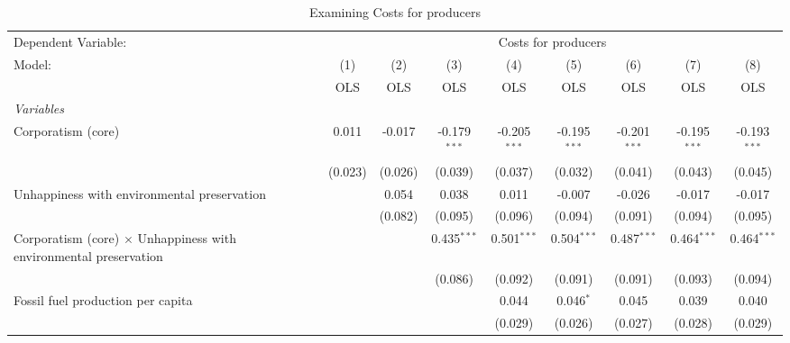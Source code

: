 
\begin{table}[htbp]
   \caption{Examining Costs for producers}
   \centering
   \begin{tabular}{lcccccccc}
      \toprule
      Dependent Variable: & \multicolumn{8}{c}{Costs for producers}\\
      Model:                                                                   & (1)     & (2)     & (3)            & (4)            & (5)            & (6)            & (7)            & (8)\\  
                                                                               &  OLS    & OLS     & OLS            & OLS            & OLS            & OLS            & OLS            & OLS\\  
      \midrule
      \emph{Variables}\\
      Corporatism (core)                                                       & 0.011   & -0.017  & -0.179$^{***}$ & -0.205$^{***}$ & -0.195$^{***}$ & -0.201$^{***}$ & -0.195$^{***}$ & -0.193$^{***}$\\   
                                                                               & (0.023) & (0.026) & (0.039)        & (0.037)        & (0.032)        & (0.041)        & (0.043)        & (0.045)\\   
      Unhappiness with environmental preservation                              &         & 0.054   & 0.038          & 0.011          & -0.007         & -0.026         & -0.017         & -0.017\\   
                                                                               &         & (0.082) & (0.095)        & (0.096)        & (0.094)        & (0.091)        & (0.094)        & (0.095)\\   
      Corporatism (core) $\times$ Unhappiness with environmental preservation  &         &         & 0.435$^{***}$  & 0.501$^{***}$  & 0.504$^{***}$  & 0.487$^{***}$  & 0.464$^{***}$  & 0.464$^{***}$\\   
                                                                               &         &         & (0.086)        & (0.092)        & (0.091)        & (0.091)        & (0.093)        & (0.094)\\   
      Fossil fuel production per capita                                        &         &         &                & 0.044          & 0.046$^{*}$    & 0.045          & 0.039          & 0.040\\   
                                                                               &         &         &                & (0.029)        & (0.026)        & (0.027)        & (0.028)        & (0.029)\\   

\end{tabular}
\end{table}
